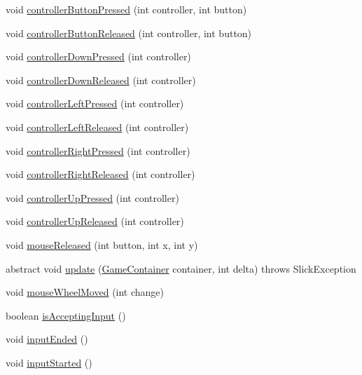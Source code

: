 \begin{DoxyCompactItemize}
void \mbox{\hyperlink{classorg_1_1newdawn_1_1slick_1_1_basic_game_a9d83c85e4046945a3459debf55079697}{controller\+Button\+Pressed}} (int controller, int button)
\item 
void \mbox{\hyperlink{classorg_1_1newdawn_1_1slick_1_1_basic_game_ad979755eccbdc2959289f001b2c26bda}{controller\+Button\+Released}} (int controller, int button)
\item 
void \mbox{\hyperlink{classorg_1_1newdawn_1_1slick_1_1_basic_game_af4db3e5b864b3ee179de6935184727ac}{controller\+Down\+Pressed}} (int controller)
\item 
void \mbox{\hyperlink{classorg_1_1newdawn_1_1slick_1_1_basic_game_a8953e34950de681231d62cb8e7297263}{controller\+Down\+Released}} (int controller)
\item 
void \mbox{\hyperlink{classorg_1_1newdawn_1_1slick_1_1_basic_game_aef303720a5e704f28de381cd96f62467}{controller\+Left\+Pressed}} (int controller)
\item 
void \mbox{\hyperlink{classorg_1_1newdawn_1_1slick_1_1_basic_game_a0fd5869789b811258bc2d8d562c36243}{controller\+Left\+Released}} (int controller)
\item 
void \mbox{\hyperlink{classorg_1_1newdawn_1_1slick_1_1_basic_game_a8c225d55800c95a5b339468d08fcf48c}{controller\+Right\+Pressed}} (int controller)
\item 
void \mbox{\hyperlink{classorg_1_1newdawn_1_1slick_1_1_basic_game_a84adeb6342b970209d965415b8d23162}{controller\+Right\+Released}} (int controller)
\item 
void \mbox{\hyperlink{classorg_1_1newdawn_1_1slick_1_1_basic_game_a56128159ddf4514b79fe5fda77d4e97b}{controller\+Up\+Pressed}} (int controller)
\item 
void \mbox{\hyperlink{classorg_1_1newdawn_1_1slick_1_1_basic_game_a3fc92fc64da3e17cac17c1110d5b7237}{controller\+Up\+Released}} (int controller)
\item 
void \mbox{\hyperlink{classorg_1_1newdawn_1_1slick_1_1_basic_game_ad5f3b68d103dc42613e5a35c7f820f72}{mouse\+Released}} (int button, int x, int y)
\item 
abstract void \mbox{\hyperlink{classorg_1_1newdawn_1_1slick_1_1_basic_game_acfe6fa05aef83bff1631af91a3e4bd20}{update}} (\mbox{\hyperlink{classorg_1_1newdawn_1_1slick_1_1_game_container}{Game\+Container}} container, int delta)  throws Slick\+Exception
\item 
void \mbox{\hyperlink{classorg_1_1newdawn_1_1slick_1_1_basic_game_a28f0cdd4678843d738312a0fa49d5cc3}{mouse\+Wheel\+Moved}} (int change)
\item 
boolean \mbox{\hyperlink{classorg_1_1newdawn_1_1slick_1_1_basic_game_a435f5bb90065a05563b04b715f02891e}{is\+Accepting\+Input}} ()
\item 
void \mbox{\hyperlink{classorg_1_1newdawn_1_1slick_1_1_basic_game_ab1d3867ead6bd9dc922c8e90a1ccc0c3}{input\+Ended}} ()
\item 
void \mbox{\hyperlink{classorg_1_1newdawn_1_1slick_1_1_basic_game_aa04bcb9e5c8687d7cc6ba05a63b93b40}{input\+Started}} ()
\end{DoxyCompactItemize}
